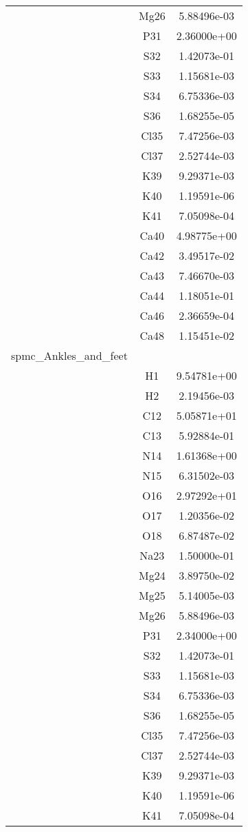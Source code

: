 \begin{centering}
\begin{longtable}{l c c}
& Mg26 & 5.88496e-03 \\ 
& P31 & 2.36000e+00 \\ 
& S32 & 1.42073e-01 \\ 
& S33 & 1.15681e-03 \\ 
& S34 & 6.75336e-03 \\ 
& S36 & 1.68255e-05 \\ 
& Cl35 & 7.47256e-03 \\ 
& Cl37 & 2.52744e-03 \\ 
& K39 & 9.29371e-03 \\ 
& K40 & 1.19591e-06 \\ 
& K41 & 7.05098e-04 \\ 
& Ca40 & 4.98775e+00 \\ 
& Ca42 & 3.49517e-02 \\ 
& Ca43 & 7.46670e-03 \\ 
& Ca44 & 1.18051e-01 \\ 
& Ca46 & 2.36659e-04 \\ 
& Ca48 & 1.15451e-02 \\ 
\hline
spmc\_Ankles\_and\_feet & & \\
\hline
& H1 & 9.54781e+00 \\ 
& H2 & 2.19456e-03 \\ 
& C12 & 5.05871e+01 \\ 
& C13 & 5.92884e-01 \\ 
& N14 & 1.61368e+00 \\ 
& N15 & 6.31502e-03 \\ 
& O16 & 2.97292e+01 \\ 
& O17 & 1.20356e-02 \\ 
& O18 & 6.87487e-02 \\ 
& Na23 & 1.50000e-01 \\ 
& Mg24 & 3.89750e-02 \\ 
& Mg25 & 5.14005e-03 \\ 
& Mg26 & 5.88496e-03 \\ 
& P31 & 2.34000e+00 \\ 
& S32 & 1.42073e-01 \\ 
& S33 & 1.15681e-03 \\ 
& S34 & 6.75336e-03 \\ 
& S36 & 1.68255e-05 \\ 
& Cl35 & 7.47256e-03 \\ 
& Cl37 & 2.52744e-03 \\ 
& K39 & 9.29371e-03 \\ 
& K40 & 1.19591e-06 \\ 
& K41 & 7.05098e-04 \\ 

\end{longtable}
\end{centering}
